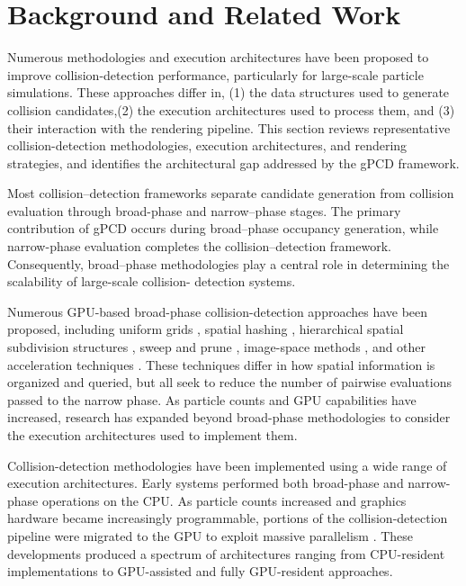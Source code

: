 \section{Background and Related Work}

Numerous methodologies and execution architectures have been proposed
to improve collision-detection performance, particularly for large-scale
particle simulations. These approaches differ in, (1) the data structures used to generate collision candidates,(2) the execution architectures used to process them, and (3) their interaction with the rendering pipeline. This section reviews representative collision-detection methodologies, execution architectures, and rendering strategies, and identifies the architectural gap addressed by the gPCD framework.

Most collision--detection frameworks separate candidate generation from
collision evaluation through broad-phase and narrow--phase stages. The
primary contribution of gPCD occurs during broad--phase occupancy
generation, while narrow-phase evaluation completes the collision--detection framework. Consequently, broad--phase methodologies play a
central role in determining the scalability of large-scale collision-
detection systems.

Numerous GPU-based broad-phase collision-detection approaches have been
proposed, including uniform grids \cite{barbieri2013}, spatial hashing
\cite{hastings}, hierarchical spatial subdivision structures
\cite{Evangelou2023}, sweep and prune \cite{capannini2016}, image-space
methods \cite{Faure2008,Jang2008a}, and other acceleration techniques
\cite{benitez2005,jansen2018}. These techniques differ in how spatial
information is organized and queried, but all seek to reduce the number
of pairwise evaluations passed to the narrow phase. As particle counts
and GPU capabilities have increased, research has expanded beyond
broad-phase methodologies to consider the execution architectures used
to implement them.

Collision-detection methodologies have been implemented using a wide
range of execution architectures. Early systems performed both
broad-phase and narrow-phase operations on the CPU. As particle counts
increased and graphics hardware became increasingly programmable,
portions of the collision-detection pipeline were migrated to the GPU
to exploit massive parallelism \cite{brodtkorb2013}. These developments
produced a spectrum of architectures ranging from CPU-resident
implementations to GPU-assisted and fully GPU-resident approaches.

